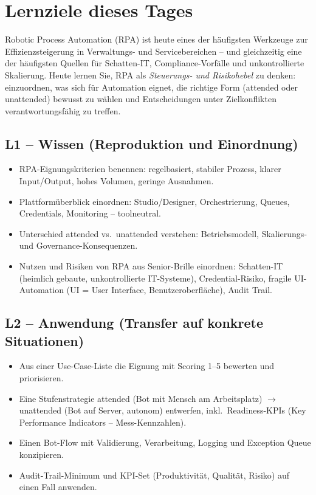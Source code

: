 \documentclass[11pt,a4paper,oneside]{article}
\begin{document}
\section*{Lernziele dieses Tages}
\thispagestyle{plain}

\noindent Robotic Process Automation (RPA) ist heute eines der häufigsten Werkzeuge zur Effizienzsteigerung in Verwaltungs- und Servicebereichen -- und gleichzeitig eine der häufigsten Quellen für Schatten-IT, Compliance-Vorfälle und unkontrollierte Skalierung. Heute lernen Sie, RPA als \emph{Steuerungs- und Risikohebel} zu denken: einzuordnen, was sich für Automation eignet, die richtige Form (attended oder unattended) bewusst zu wählen und Entscheidungen unter Zielkonflikten verantwortungsfähig zu treffen.

\subsection*{L1 -- Wissen (Reproduktion und Einordnung)}
\begin{itemize}
  \item RPA-Eignungskriterien benennen: regelbasiert, stabiler Prozess, klarer Input/Output, hohes Volumen, geringe Ausnahmen.
  \item Plattformüberblick einordnen: Studio/Designer, Orchestrierung, Queues, Credentials, Monitoring -- toolneutral.
  \item Unterschied attended vs.\ unattended verstehen: Betriebsmodell, Skalierungs- und Governance-Konsequenzen.
  \item Nutzen und Risiken von RPA aus Senior-Brille einordnen: Schatten-IT (heimlich gebaute, unkontrollierte IT-Systeme), Credential-Risiko, fragile UI-Automation (UI = User Interface, Benutzeroberfl\"ache), Audit Trail.
\end{itemize}

\subsection*{L2 -- Anwendung (Transfer auf konkrete Situationen)}
\begin{itemize}
  \item Aus einer Use-Case-Liste die Eignung mit Scoring 1--5 bewerten und priorisieren.
  \item Eine Stufenstrategie attended (Bot mit Mensch am Arbeitsplatz) $\to$ unattended (Bot auf Server, autonom) entwerfen, inkl.\ Readiness-KPIs (Key Performance Indicators -- Mess-Kennzahlen).
  \item Einen Bot-Flow mit Validierung, Verarbeitung, Logging und Exception Queue konzipieren.
  \item Audit-Trail-Minimum und KPI-Set (Produktivität, Qualität, Risiko) auf einen Fall anwenden.
\end{itemize}
\end{document}
